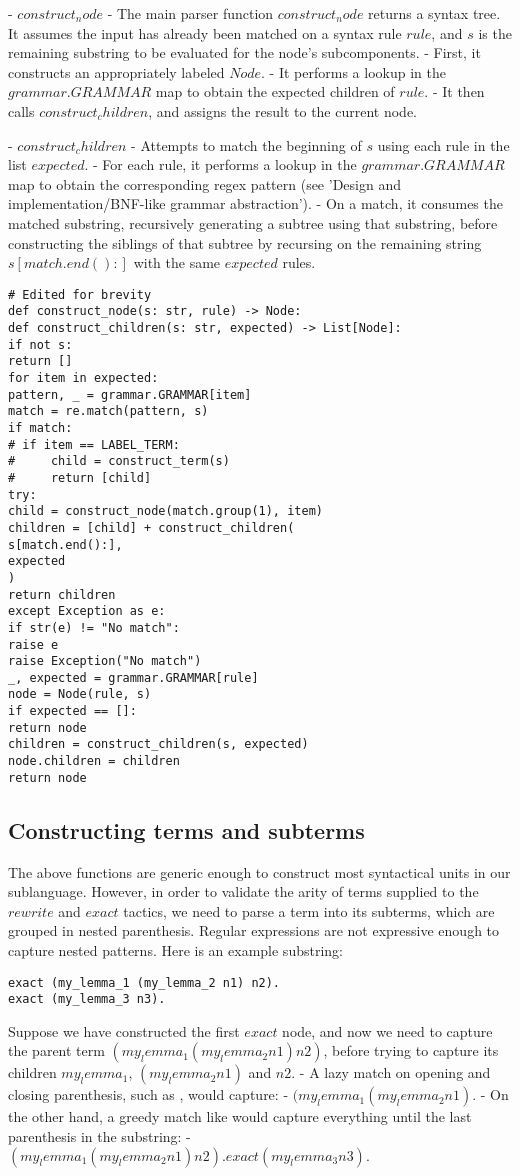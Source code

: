 - $construct_node$
- The main parser function $construct_node$ returns a syntax tree. It assumes the input has already been matched on a syntax rule $rule$, and $s$ is the remaining substring to be evaluated for the node's subcomponents.
- First, it constructs an appropriately labeled $Node$.
- It performs a lookup in the $grammar.GRAMMAR$ map to obtain the expected children of $rule$.
- It then calls $construct_children$, and assigns the result to the current node.

- $construct_children$
- Attempts to match the beginning of $s$ using each rule in the list $expected$.
- For each rule, it performs a lookup in the $grammar.GRAMMAR$ map to obtain the corresponding regex pattern (see 'Design and implementation/BNF-like grammar abstraction').
- On a match, it consumes the matched substring, recursively generating a subtree using that substring, before constructing the siblings of that subtree by recursing on  the remaining string $s[match.end():]$ with the same $expected$ rules.

\begin{lstlisting}
# Edited for brevity
def construct_node(s: str, rule) -> Node:
def construct_children(s: str, expected) -> List[Node]:
if not s:
return []
for item in expected:
pattern, _ = grammar.GRAMMAR[item]
match = re.match(pattern, s)
if match:
# if item == LABEL_TERM:
#     child = construct_term(s)
#     return [child]
try:
child = construct_node(match.group(1), item)
children = [child] + construct_children(
s[match.end():],
expected
)
return children
except Exception as e:
if str(e) != "No match":
raise e
raise Exception("No match")
_, expected = grammar.GRAMMAR[rule]
node = Node(rule, s)
if expected == []:
return node
children = construct_children(s, expected)
node.children = children
return node
\end{lstlisting}

\subsection{Constructing terms and subterms}

The above functions are generic enough to construct most syntactical units in our sublanguage. However, in order to validate the arity of terms supplied to the $rewrite$ and $exact$ tactics, we need to parse a term into its subterms, which are grouped in nested parenthesis. Regular expressions are not expressive enough to capture nested patterns. Here is an example substring:
\begin{lstlisting}
exact (my_lemma_1 (my_lemma_2 n1) n2).
exact (my_lemma_3 n3).
\end{lstlisting}
Suppose we have constructed the first $exact$ node, and now we need to capture the parent term $(my_lemma_1 (my_lemma_2 n1) n2)$, before trying to capture its children $my_lemma_1$, $(my_lemma_2 n1)$ and $n2$.
- A lazy match on opening and closing parenthesis, such as , would capture:
-  $(my_lemma_1 (my_lemma_2 n1)$.
- On the other hand, a greedy match like  would capture everything until the last parenthesis in the substring:
- $(my_lemma_1 (my_lemma_2 n1) n2).exact (my_lemma_3 n3).$

